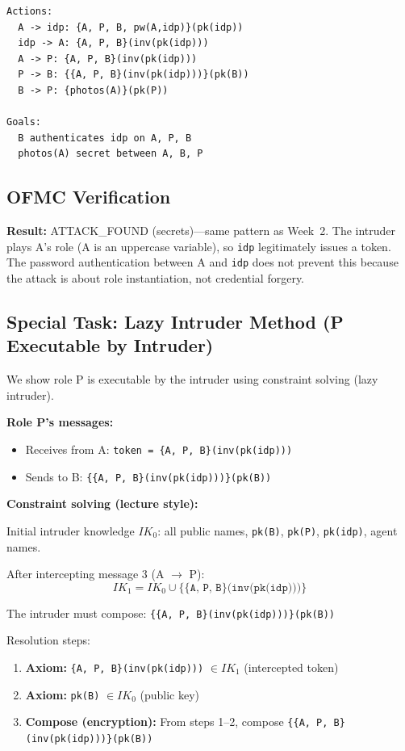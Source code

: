 \documentclass[11pt,a4paper]{article}
\begin{document}
\begin{lstlisting}[style=anb,caption={Week 3: Full protocol with password authentication}]
Actions:
  A -> idp: {A, P, B, pw(A,idp)}(pk(idp))
  idp -> A: {A, P, B}(inv(pk(idp)))
  A -> P: {A, P, B}(inv(pk(idp)))
  P -> B: {{A, P, B}(inv(pk(idp)))}(pk(B))
  B -> P: {photos(A)}(pk(P))

Goals:
  B authenticates idp on A, P, B
  photos(A) secret between A, B, P
\end{lstlisting}

\subsection{OFMC Verification}
\textbf{Result:} ATTACK\_FOUND (secrets)---same pattern as Week~2. The intruder plays A's
role (A is an uppercase variable), so \texttt{idp} legitimately issues a token. The password
authentication between A and \texttt{idp} does not prevent this because the attack is about
role instantiation, not credential forgery.

\subsection{Special Task: Lazy Intruder Method (P Executable by Intruder)}
We show role P is executable by the intruder using constraint solving (lazy intruder).

\textbf{Role P's messages:}
\begin{itemize}[leftmargin=*]
  \item Receives from A: \texttt{token = \{A, P, B\}(inv(pk(idp)))}
  \item Sends to B: \texttt{\{\{A, P, B\}(inv(pk(idp)))\}(pk(B))}
\end{itemize}

\textbf{Constraint solving (lecture style):}

\noindent Initial intruder knowledge $\mathit{IK}_0$: all public names, \texttt{pk(B)}, \texttt{pk(P)}, \texttt{pk(idp)}, agent names.

\noindent After intercepting message 3 (A $\to$ P):
\[
\mathit{IK}_1 = \mathit{IK}_0 \cup \{\texttt{\{A, P, B\}(inv(pk(idp)))}\}
\]

\noindent The intruder must compose:
\texttt{\{\{A, P, B\}(inv(pk(idp)))\}(pk(B))}

\noindent Resolution steps:
\begin{enumerate}
  \item \textbf{Axiom:} \texttt{\{A, P, B\}(inv(pk(idp)))} $\in \mathit{IK}_1$ \quad (intercepted token)
  \item \textbf{Axiom:} \texttt{pk(B)} $\in \mathit{IK}_0$ \quad (public key)
  \item \textbf{Compose (encryption):} From steps 1--2, compose
        \texttt{\{\{A, P, B\}(inv(pk(idp)))\}(pk(B))}
\end{enumerate}
\end{document}
